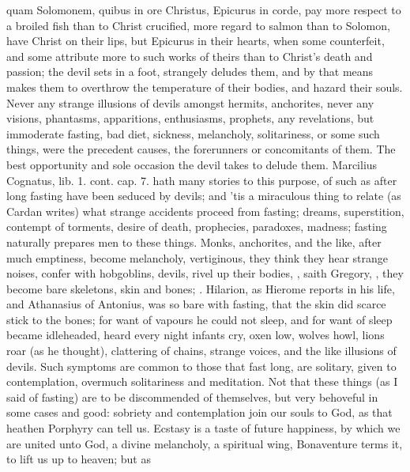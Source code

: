{{quam Solomonem, quibus in ore Christus, Epicurus in corde}, pay more
respect to a broiled fish than to Christ crucified, more regard to
salmon than to Solomon, have Christ on their lips, but Epicurus in
their hearts, when some counterfeit, and some attribute more to such
works of theirs than to Christ's death and passion; the devil sets in a
foot, strangely deludes them, and by that means makes them to overthrow
the temperature of their bodies, and hazard their souls. Never any
strange illusions of devils amongst hermits, anchorites, never any
visions, phantasms, apparitions, enthusiasms, prophets, any
revelations, but immoderate fasting, bad diet, sickness, melancholy,
solitariness, or some such things, were the precedent causes, the
forerunners or concomitants of them. The best opportunity and sole
occasion the devil takes to delude them. Marcilius Cognatus, \textlatin{lib. 1.
cont. cap. 7.} hath many stories to this purpose, of such as after long
fasting have been seduced by devils; and 'tis a miraculous thing
to relate (as Cardan writes) what strange accidents proceed from
fasting; dreams, superstition, contempt of torments, desire of death,
prophecies, paradoxes, madness; fasting naturally prepares men to these
things. Monks, anchorites, and the like, after much emptiness, become
melancholy, vertiginous, they think they hear strange noises, confer
with hobgoblins, devils, rivel up their bodies, , saith Gregory, , they
become bare skeletons, skin and bones; . Hilarion,
as Hierome reports in his life, and Athanasius of Antonius, was
so bare with fasting, that the skin did scarce stick to the bones; for
want of vapours he could not sleep, and for want of sleep became
idleheaded, heard every night infants cry, oxen low, wolves howl, lions
roar (as he thought), clattering of chains, strange voices, and the
like illusions of devils. Such symptoms are common to those that fast
long, are solitary, given to contemplation, overmuch solitariness and
meditation. Not that these things (as I said of fasting) are to be
discommended of themselves, but very behoveful in some cases and good:
sobriety and contemplation join our souls to God, as that heathen
Porphyry can tell us. Ecstasy is a taste of future
happiness, by which we are united unto God, a divine melancholy, a
spiritual wing, Bonaventure terms it, to lift us up to heaven; but as
}
